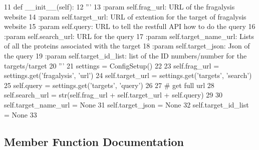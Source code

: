 \begin{DoxyCode}
11     \textcolor{keyword}{def }\_\_init\_\_(self):
12         \textcolor{stringliteral}{'''}
13 \textcolor{stringliteral}{        :param self.frag\_url: URL of the fragalysis website}
14 \textcolor{stringliteral}{        :param self.target\_url: URL of extention for the target of fragalysis website}
15 \textcolor{stringliteral}{        :param self.query: URL to tell the restfull API how to do the query}
16 \textcolor{stringliteral}{        :param self.search\_url: URL for the query }
17 \textcolor{stringliteral}{        :param self.target\_name\_url: Lists of all the proteins associated with the target}
18 \textcolor{stringliteral}{        :param self.target\_json: Json of the query}
19 \textcolor{stringliteral}{        :param self.target\_id\_list: list of the ID numbers/number for the targets/target}
20 \textcolor{stringliteral}{        '''}
21         settings = ConfigSetup()
22 
23         self.frag\_url = settings.get(\textcolor{stringliteral}{'fragalysis'}, \textcolor{stringliteral}{'url'})
24         self.target\_url = settings.get(\textcolor{stringliteral}{'targets'}, \textcolor{stringliteral}{'search'})
25         self.query = settings.get(\textcolor{stringliteral}{'targets'}, \textcolor{stringliteral}{'query'})
26 
27         \textcolor{comment}{# get full url}
28         self.search\_url = str(self.frag\_url + self.target\_url + self.query)
29 
30         self.target\_name\_url = \textcolor{keywordtype}{None}
31         self.target\_json = \textcolor{keywordtype}{None}
32         self.target\_id\_list = \textcolor{keywordtype}{None}
33 
\end{DoxyCode}


\subsection{Member Function Documentation}
\mbox{\label{classfragalysis__api_1_1xcextracter_1_1getdata_1_1_get_targets_data_af26e1f97fa431c2bb490985e7af0eb45}} 
